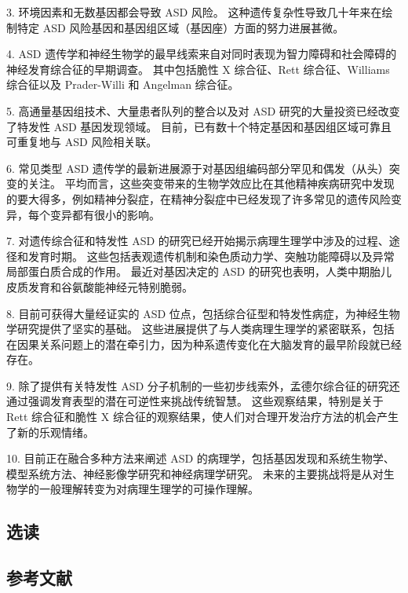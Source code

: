 3. 环境因素和无数基因都会导致 ASD 风险。 这种遗传复杂性导致几十年来在绘制特定 ASD 风险基因和基因组区域（基因座）方面的努力进展甚微。 

4. ASD 遗传学和神经生物学的最早线索来自对同时表现为智力障碍和社会障碍的神经发育综合征的早期调查。 其中包括脆性 X 综合征、Rett 综合征、Williams 综合征以及 Prader-Willi 和 Angelman 综合征。 

5. 高通量基因组技术、大量患者队列的整合以及对 ASD 研究的大量投资已经改变了特发性 ASD 基因发现领域。 目前，已有数十个特定基因和基因组区域可靠且可重复地与 ASD 风险相关联。 

6. 常见类型 ASD 遗传学的最新进展源于对基因组编码部分罕见和偶发（从头）突变的关注。 平均而言，这些突变带来的生物学效应比在其他精神疾病研究中发现的要大得多，例如精神分裂症，在精神分裂症中已经发现了许多常见的遗传风险变异，每个变异都有很小的影响。 

7. 对遗传综合征和特发性 ASD 的研究已经开始揭示病理生理学中涉及的过程、途径和发育时期。 这些包括表观遗传机制和染色质动力学、突触功能障碍以及异常局部蛋白质合成的作用。 最近对基因决定的 ASD 的研究也表明，人类中期胎儿皮质发育和谷氨酸能神经元特别脆弱。 

8. 目前可获得大量经证实的 ASD 位点，包括综合征型和特发性病症，为神经生物学研究提供了坚实的基础。 这些进展提供了与人类病理生理学的紧密联系，包括在因果关系问题上的潜在牵引力，因为种系遗传变化在大脑发育的最早阶段就已经存在。 

9. 除了提供有关特发性 ASD 分子机制的一些初步线索外，孟德尔综合征的研究还通过强调发育表型的潜在可逆性来挑战传统智慧。 这些观察结果，特别是关于 Rett 综合征和脆性 X 综合征的观察结果，使人们对合理开发治疗方法的机会产生了新的乐观情绪。 

10. 目前正在融合多种方法来阐述 ASD 的病理学，包括基因发现和系统生物学、模型系统方法、神经影像学研究和神经病理学研究。 未来的主要挑战将是从对生物学的一般理解转变为对病理生理学的可操作理解。

\subsection{选读}
\subsection{参考文献}